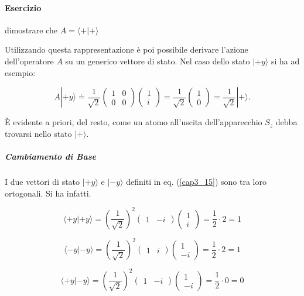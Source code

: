 \paragraph{Esercizio}
dimostrare  che $A= \langle + | + \rangle $

Utilizzando questa rappresentazione è poi possibile derivare l'azione dell'operatore $A$ su un generico vettore di stato. Nel caso dello stato $| +y \rangle $ si ha ad esempio:

\begin{equation}
A | +y \rangle \doteq \frac{1}{\sqrt{2}}
\begin{pmatrix}
1 & 0\\
0 & 0
\end{pmatrix}
\begin{pmatrix}
1\\
i
\end{pmatrix}=
\frac{1}{\sqrt{2}}\begin{pmatrix}
1\\
0
\end{pmatrix}=
\frac{1}{\sqrt{2}}| + \rangle .
\end{equation}

È evidente a priori, del resto, come un atomo all'uscita dell'apparecchio $S_z$ debba trovarsi nello stato $| + \rangle $.

\subparagraph{Cambiamento di Base}
I due vettori di stato $| +y \rangle $ e $| -y \rangle$ definiti in eq. (\ref{cap3_15}) sono tra loro ortogonali. Si ha infatti.

\begin{equation}
\langle +y | +y \rangle=\left(\frac{1}{\sqrt{2}}\right)^2
\begin{pmatrix}
1 & -i
\end{pmatrix}
\begin{pmatrix}
1 \\
i
\end{pmatrix}=
\frac{1}{2}\cdot 2= 1
\end{equation}

\begin{equation}
\langle -y | -y \rangle =\left(\frac{1}{\sqrt{2}}\right)^2
\begin{pmatrix}
1 & i
\end{pmatrix}
\begin{pmatrix}
1 \\
-i
\end{pmatrix}=
\frac{1}{2}\cdot 2= 1
\end{equation}

\begin{equation}
\langle +y | -y \rangle =\left(\frac{1}{\sqrt{2}}\right)^2
\begin{pmatrix}
1 & -i
\end{pmatrix}
\begin{pmatrix}
1 \\
-i
\end{pmatrix}=
\frac{1}{2}\cdot 0= 0
\end{equation}

